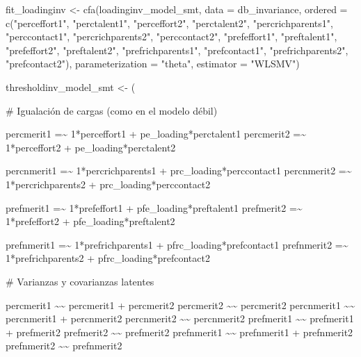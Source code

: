 \documentclass[
  12pt,
]{article}
\newenvironment{Shaded}{\begin{snugshade}}{\end{snugshade}}
\newcommand{\AttributeTok}[1]{\textcolor[rgb]{0.40,0.45,0.13}{#1}}
\newcommand{\FunctionTok}[1]{\textcolor[rgb]{0.28,0.35,0.67}{#1}}
\newcommand{\NormalTok}[1]{\textcolor[rgb]{0.00,0.23,0.31}{#1}}
\newcommand{\OtherTok}[1]{\textcolor[rgb]{0.00,0.23,0.31}{#1}}
\newcommand{\StringTok}[1]{\textcolor[rgb]{0.13,0.47,0.30}{#1}}
\begin{document}
\begin{Shaded}
\begin{Highlighting}[]
\NormalTok{fit\_loadinginv }\OtherTok{\textless{}{-}} \FunctionTok{cfa}\NormalTok{(loadinginv\_model\_smt, }\AttributeTok{data =}\NormalTok{ db\_invariance,}
                      \AttributeTok{ordered =} \FunctionTok{c}\NormalTok{(}\StringTok{"perceffort1"}\NormalTok{, }\StringTok{"perctalent1"}\NormalTok{, }\StringTok{"perceffort2"}\NormalTok{, }\StringTok{"perctalent2"}\NormalTok{,}
                                  \StringTok{"percrichparents1"}\NormalTok{, }\StringTok{"perccontact1"}\NormalTok{, }\StringTok{"percrichparents2"}\NormalTok{, }\StringTok{"perccontact2"}\NormalTok{,}
                                  \StringTok{"prefeffort1"}\NormalTok{, }\StringTok{"preftalent1"}\NormalTok{, }\StringTok{"prefeffort2"}\NormalTok{, }\StringTok{"preftalent2"}\NormalTok{,}
                                  \StringTok{"prefrichparents1"}\NormalTok{, }\StringTok{"prefcontact1"}\NormalTok{, }\StringTok{"prefrichparents2"}\NormalTok{, }\StringTok{"prefcontact2"}\NormalTok{),}
                      \AttributeTok{parameterization =} \StringTok{"theta"}\NormalTok{,}
                      \AttributeTok{estimator =} \StringTok{"WLSMV"}\NormalTok{)}

\NormalTok{thresholdinv\_model\_smt }\OtherTok{\textless{}{-}}\NormalTok{ (}\StringTok{\textquotesingle{}}

\StringTok{\# Igualación de cargas (como en el modelo débil)}

\StringTok{percmerit1  =\textasciitilde{} 1*perceffort1 + pe\_loading*perctalent1}
\StringTok{percmerit2  =\textasciitilde{} 1*perceffort2 + pe\_loading*perctalent2}

\StringTok{percnmerit1 =\textasciitilde{} 1*percrichparents1 + prc\_loading*perccontact1}
\StringTok{percnmerit2 =\textasciitilde{} 1*percrichparents2 + prc\_loading*perccontact2}

\StringTok{prefmerit1  =\textasciitilde{} 1*prefeffort1 + pfe\_loading*preftalent1}
\StringTok{prefmerit2  =\textasciitilde{} 1*prefeffort2 + pfe\_loading*preftalent2}

\StringTok{prefnmerit1 =\textasciitilde{} 1*prefrichparents1 + pfrc\_loading*prefcontact1}
\StringTok{prefnmerit2 =\textasciitilde{} 1*prefrichparents2 + pfrc\_loading*prefcontact2}


\StringTok{\# Varianzas y covarianzas latentes}

\StringTok{percmerit1  \textasciitilde{}\textasciitilde{} percmerit1 + percmerit2}
\StringTok{percmerit2  \textasciitilde{}\textasciitilde{} percmerit2}
\StringTok{percnmerit1 \textasciitilde{}\textasciitilde{} percnmerit1 + percnmerit2}
\StringTok{percnmerit2 \textasciitilde{}\textasciitilde{} percnmerit2}
\StringTok{prefmerit1  \textasciitilde{}\textasciitilde{} prefmerit1 + prefmerit2}
\StringTok{prefmerit2  \textasciitilde{}\textasciitilde{} prefmerit2}
\StringTok{prefnmerit1 \textasciitilde{}\textasciitilde{} prefnmerit1 + prefnmerit2}
\StringTok{prefnmerit2 \textasciitilde{}\textasciitilde{} prefnmerit2}



\end{Highlighting}
\end{Shaded}
\end{document}
